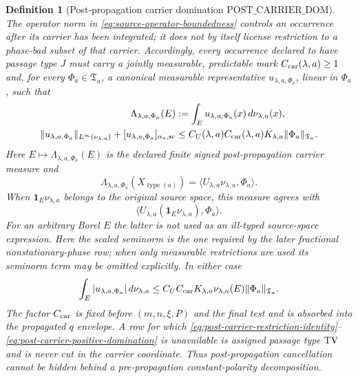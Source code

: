 \documentclass[11pt]{article}
\newtheorem{definition}[theorem]{Definition}
\newcommand{\one}{\mathbf 1}
\begin{document}
\begin{definition}[Post-propagation carrier domination
$\mathrm{POST\_CARRIER\_DOM}$]
\label{def:post-carrier-domination}
The operator norm in
\eqref{eq:source-operator-boundedness} controls an occurrence after its
carrier has been integrated; it does not by itself license restriction to a
phase-bad subset of that carrier.  Accordingly, every occurrence declared
to have passage type $J$ must carry a jointly measurable, predictable mark
$C_{\rm car}(\lambda,a)\ge1$ and, for every
$\Phi_a\in\mathfrak T_a$, a canonical measurable representative
$u_{\lambda,a,\Phi_a}$, linear in $\Phi_a$, such that
\begin{align}
 \Lambda_{\lambda,a,\Phi_a}(E)
 &:=\int_Eu_{\lambda,a,\Phi_a}(x)\,d\nu_{\lambda,a}(x),
 \label{eq:post-carrier-restriction-identity}\\
 \|u_{\lambda,a,\Phi_a}\|_{L^\infty(\nu_{\lambda,a})}
 +[u_{\lambda,a,\Phi_a}]_{\alpha_*,{\rm sc}}
 &\le C_U(\lambda,a)C_{\rm car}(\lambda,a)K_{\lambda,a}
       \|\Phi_a\|_{\mathfrak T_a}.
 \label{eq:post-carrier-positive-domination}
\end{align}
Here $E\mapsto\Lambda_{\lambda,a,\Phi_a}(E)$ is the declared finite signed
post-propagation carrier measure and
\begin{equation}
\label{eq:post-carrier-full-pairing}
 \Lambda_{\lambda,a,\Phi_a}(X_{\operatorname{type}(a)})
 =\langle U_{\lambda,a}\nu_{\lambda,a},\Phi_a\rangle.
\end{equation}
When $\one_E\nu_{\lambda,a}$ belongs to the original source space, this
measure agrees with
\[
 \langle U_{\lambda,a}(\one_E\nu_{\lambda,a}),\Phi_a\rangle.
\]
For an
arbitrary Borel $E$ the latter is not used as an ill-typed source-space
expression.
Here the scaled seminorm is the one required by the later fractional
nonstationary-phase row; when only measurable restrictions are used its
seminorm term may be omitted explicitly.  In either case
\begin{equation}
 \label{eq:post-carrier-set-domination}
 \int_E|u_{\lambda,a,\Phi_a}|\,d\nu_{\lambda,a}
 \le C_UC_{\rm car}K_{\lambda,a}\nu_{\lambda,a}(E)
       \|\Phi_a\|_{\mathfrak T_a}.
\end{equation}
The factor $C_{\rm car}$ is fixed before $(m,n,\xi,P)$ and the final test
and is absorbed into the propagated $q$ envelope.  A row for which
\eqref{eq:post-carrier-restriction-identity}--
\eqref{eq:post-carrier-positive-domination} is unavailable is assigned
passage type ${\rm TV}$ and is never cut in the carrier coordinate.  Thus
post-propagation cancellation cannot be hidden behind a pre-propagation
constant-polarity decomposition.
\end{definition}
\end{document}
